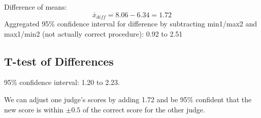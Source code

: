 \documentclass[letterpaper, landscape]{exam}
\begin{document}
  Difference of means:
  \[
    \bar{x}_{diff} = 8.06 - 6.34 = 1.72
  \]
  Aggregated 95\% confidence interval for difference by subtracting min1/max2
  and max1/min2 (not actually correct procedure): 0.92 to 2.51
  
  \subsection{T-test of Differences} %

  95\% confidence interval: 1.20 to 2.23.

  We can adjust one judge's scores by adding 1.72 and be 95\% confident that the
  new score is within $\pm 0.5$ of the correct score for the other judge.
\end{document}
